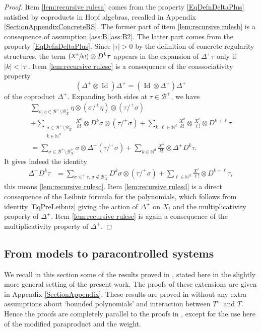 \documentclass[JEP,XML,SOM,Unicode,published]{cedram}
\newcommand{\Psfrac}[2]{(\sfrac{#1}{#2})}
\theoremstyle{plain}
\theoremstyle{definition}
\DeclareMathOperator{\iden}{Id}
\newcommand{\bbN}{\mathbb{N}}
\newcommand{\mcB}{\mathcal{B}}
\begin{document}
\begin{proof}
Item \eqref{lem:recursive rulesa} comes from the property \eqref{EqDefnDeltaPlus} satisfied by coproducts in Hopf algebras, recalled in Appendix \ref{SectionAppendixConcreteRS}. The former part of item \eqref{lem:recursive rulesb} is a consequence of assumption \ref{ass:B}\eqref{ass:B2}.
The latter part comes from the property \eqref{EqDefnDeltaPlus}. Since $|\tau|>0$ by the definition of concrete regularity structures, the term $\Psfrac{X^k}{k!}\otimes D^k\tau$ appears in the expansion of $\Delta^+\tau$ only if $|k|<|\tau|$.
Item \eqref{lem:recursive rulesc} is a consequence of the coassociativity property
\[
(\Delta^+\otimes\iden)\Delta^+ = (\iden\otimes\Delta^+)\Delta^+
\]
of the coproduct $\Delta^+$. Expanding both sides at $\tau\in\mcB^+$, we have
\begin{multline*}
\sum_{\sigma,\eta\in\mcB^+\setminus\mcB_X^+}\eta\otimes(\sigma/^+\eta)\otimes(\tau/^+\sigma)\\[-10pt]
+\sum_{\substack{\sigma\in\mcB^+\setminus\mcB_X^+\\k\in\bbN^d}}\frac{X^k}{k!}\otimes D^k\sigma\otimes(\tau/^+\sigma)
+\sum_{k,\ell\in\bbN^d}\frac{X^k}{k!}\otimes\frac{X^\ell}{\ell!}\otimes D^{k+\ell}\tau\\[-10pt]
=\sum_{\sigma\in\mcB^+\setminus\mcB_X^+}\sigma\otimes\Delta^+(\tau/^+\sigma)
+\sum_{k\in\bbN^d}\frac{X^k}{k!}\otimes \Delta^+D^k\tau.
\end{multline*}
It gives indeed the identity
\begin{align}
\label{defi:D^ktau}
\Delta^+D^k\tau &= \sum_{\sigma\leq^+\tau,\, \sigma\notin\mcB_X^+}D^k\sigma\otimes(\tau/^+\sigma) + \sum_{\ell\in\bbN^d}\frac{X^{\ell}}{\ell!}\otimes D^{k+\ell}\tau,
\end{align}
this means \eqref{lem:recursive rulesc}. Item \eqref{lem:recursive rulesd} is a direct consequence of the Leibniz formula for the polynomials, which follows from identity \eqref{EqPreLeibniz} giving the action of $\Delta^+$ on $X_i$ and the multiplicativity property of $\Delta^+$. Item \eqref{lem:recursive rulese} is again a consequence of the multiplicativity property of $\Delta^+$.
\end{proof}

\subsection{From models to paracontrolled systems}
\label{SubsectionFromModelsToPCSystems}

We recall in this section some of the results proved in \cite{BH}, stated here in the slightly more general setting of the present work.
The proofs of these extensions are given in Appendix \ref{SectionAppendix}. These results are proved in \cite[\S\S2\,\&\,3]{BH} without any extra assumptions about `bounded polynomials' and interaction between $T^+$ and $T$. Hence the proofs are completely parallel to the proofs in \cite{BH}, except for the use here of the modified paraproduct and the weight.
\end{document}
